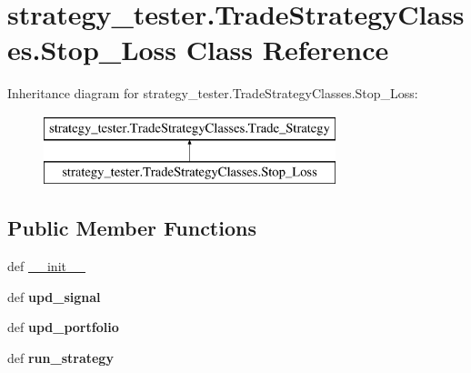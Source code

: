 \hypertarget{classstrategy__tester_1_1TradeStrategyClasses_1_1Stop__Loss}{\section{strategy\-\_\-tester.\-Trade\-Strategy\-Classes.\-Stop\-\_\-\-Loss \-Class \-Reference}
\label{classstrategy__tester_1_1TradeStrategyClasses_1_1Stop__Loss}
}
\-Inheritance diagram for strategy\-\_\-tester.\-Trade\-Strategy\-Classes.\-Stop\-\_\-\-Loss\-:\begin{figure}[H]
\begin{center}
\leavevmode
\includegraphics[height=2.000000cm]{classstrategy__tester_1_1TradeStrategyClasses_1_1Stop__Loss}
\end{center}
\end{figure}
\subsection*{\-Public \-Member \-Functions}
\begin{DoxyCompactItemize}
\item 
def \hyperlink{classstrategy__tester_1_1TradeStrategyClasses_1_1Stop__Loss_ab56994c9754f521874232c40cbd86502}{\-\_\-\-\_\-init\-\_\-\-\_\-}
\item 
\hypertarget{classstrategy__tester_1_1TradeStrategyClasses_1_1Stop__Loss_a12108379a288792ac76d59d9f7d63aa4}{def {\bfseries upd\-\_\-signal}}\label{classstrategy__tester_1_1TradeStrategyClasses_1_1Stop__Loss_a12108379a288792ac76d59d9f7d63aa4}

\item 
\hypertarget{classstrategy__tester_1_1TradeStrategyClasses_1_1Stop__Loss_a09baf38b8ba0b425773aa1abe60ecd71}{def {\bfseries upd\-\_\-portfolio}}\label{classstrategy__tester_1_1TradeStrategyClasses_1_1Stop__Loss_a09baf38b8ba0b425773aa1abe60ecd71}

\item 
\hypertarget{classstrategy__tester_1_1TradeStrategyClasses_1_1Stop__Loss_ae33e3ad5a8b3e3c9137338b33f1ee18a}{def {\bfseries run\-\_\-strategy}}\label{classstrategy__tester_1_1TradeStrategyClasses_1_1Stop__Loss_ae33e3ad5a8b3e3c9137338b33f1ee18a}

\end{DoxyCompactItemize}
